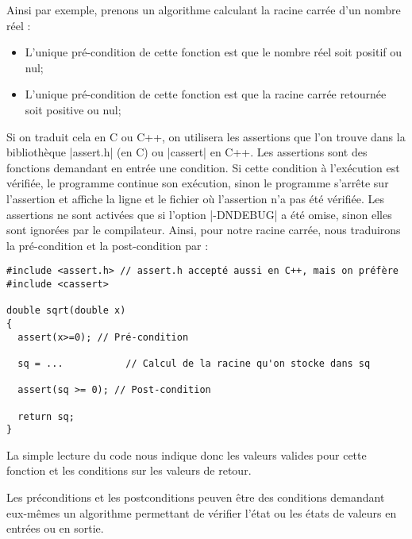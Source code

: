 Ainsi par exemple, prenons un algorithme calculant la racine carrée d'un nombre réel :
\begin{itemize}
  \item L'unique pré-condition de cette fonction est que le nombre réel soit positif ou nul;
  \item L'unique pré-condition de cette fonction est que la racine carrée retournée soit positive ou nul;
\end{itemize}

Si on traduit cela en C ou C++, on utilisera les assertions que l'on trouve dans la bibliothèque |assert.h| (en C) ou |cassert| en C++. Les assertions sont des fonctions demandant en entrée une condition. Si cette condition à l'exécution est vérifiée,
le programme continue son exécution, sinon le programme s'arrête sur l'assertion et affiche la ligne et le fichier où l'assertion n'a pas été vérifiée. Les assertions ne sont activées que si l'option |-DNDEBUG| a été omise, sinon elles sont ignorées par le compilateur. Ainsi, pour notre racine carrée, nous traduirons la pré-condition et la post-condition par :
\begin{lstlisting}[caption = Exemple d'utilisation d'assertion (C ou C++)]
#include <assert.h> // assert.h accepté aussi en C++, mais on préfère #include <cassert>

double sqrt(double x)
{
  assert(x>=0); // Pré-condition

  sq = ...           // Calcul de la racine qu'on stocke dans sq

  assert(sq >= 0); // Post-condition

  return sq;
}
\end{lstlisting}

La simple lecture du code nous indique donc les valeurs valides pour cette fonction et les conditions sur les valeurs de retour.

Les préconditions et les postconditions peuven être des conditions demandant eux-mêmes un algorithme permettant de vérifier l'état ou les états de valeurs en entrées ou en sortie.

